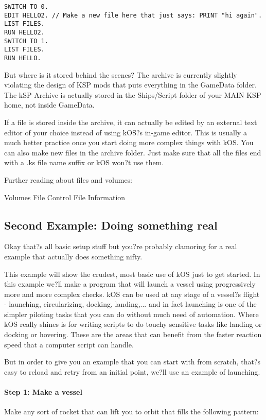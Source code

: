 \begin{Verbatim}[frame=single]
SWITCH TO 0.
EDIT HELLO2. // Make a new file here that just says: PRINT "hi again".
LIST FILES.
RUN HELLO2.
SWITCH TO 1.
LIST FILES.
RUN HELLO.
\end{Verbatim} 

But where is it stored behind the scenes? The archive is currently slightly violating the design of KSP mods that puts everything in the GameData folder. The kSP Archive is actually stored in the Ships/Script folder of your MAIN KSP home, not inside GameData.

If a file is stored inside the archive, it can actually be edited by an external text editor of your choice instead of using kOS?s in-game editor. This is usually a much better practice once you start doing more complex things with kOS. You can also make new files in the archive folder. Just make sure that all the files end with a .ks file name suffix or kOS won?t use them.	

Further reading about files and volumes:

Volumes
File Control
File Information		
		\subsection{Second Example: Doing something real}%
Okay that?s all basic setup stuff but you?re probably clamoring for a real example that actually does something nifty.

This example will show the crudest, most basic use of kOS just to get started. In this example we?ll make a program that will launch a vessel using progressively more and more complex checks. kOS can be used at any stage of a vessel?s flight - launching, circularizing, docking, landing,... and in fact launching is one of the simpler piloting tasks that you can do without much need of automation. Where kOS really shines is for writing scripts to do touchy sensitive tasks like landing or docking or hovering. These are the areas that can benefit from the faster reaction speed that a computer script can handle.

But in order to give you an example that you can start with from scratch, that?s easy to reload and retry from an initial point, we?ll use an example of launching.

\paragraph{Step 1: Make a vessel}
Make any sort of rocket that can lift you to orbit that fills the following pattern:

